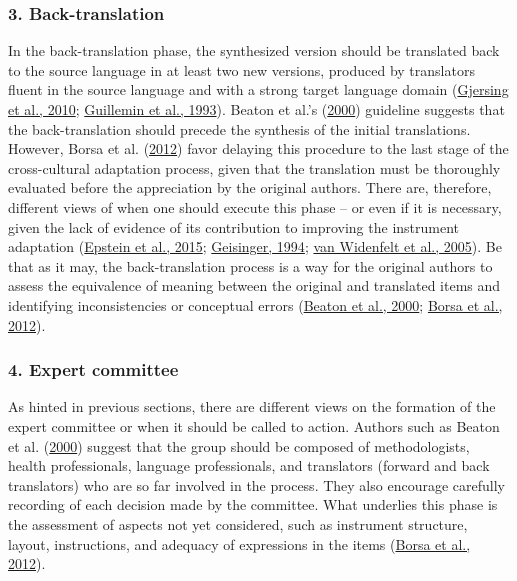 \documentclass[
  ,doc,11pt, twoside,floatsintext]{apa6}
\begin{document}
\hypertarget{back-translation}{%
\subsubsection{3. Back-translation}\label{back-translation}}

In the back-translation phase, the synthesized version should be translated back to the source language in at least two new versions, produced by translators fluent in the source language and with a strong target language domain (\protect\hyperlink{ref-gjersing2010}{Gjersing et al., 2010}; \protect\hyperlink{ref-guillemin1993}{Guillemin et al., 1993}). Beaton et al.'s (\protect\hyperlink{ref-beaton2000}{2000}) guideline suggests that the back-translation should precede the synthesis of the initial translations. However, Borsa et al. (\protect\hyperlink{ref-borsaAdaptacaoValidacaoInstrumentos2012}{2012}) favor delaying this procedure to the last stage of the cross-cultural adaptation process, given that the translation must be thoroughly evaluated before the appreciation by the original authors. There are, therefore, different views of when one should execute this phase -- or even if it is necessary, given the lack of evidence of its contribution to improving the instrument adaptation (\protect\hyperlink{ref-epstein2015}{Epstein et al., 2015}; \protect\hyperlink{ref-geisinger1994}{Geisinger, 1994}; \protect\hyperlink{ref-vanwidenfelt2005}{van Widenfelt et al., 2005}). Be that as it may, the back-translation process is a way for the original authors to assess the equivalence of meaning between the original and translated items and identifying inconsistencies or conceptual errors (\protect\hyperlink{ref-beaton2000}{Beaton et al., 2000}; \protect\hyperlink{ref-borsaAdaptacaoValidacaoInstrumentos2012}{Borsa et al., 2012}).

\hypertarget{expert-committee}{%
\subsubsection{4. Expert committee}\label{expert-committee}}

As hinted in previous sections, there are different views on the formation of the expert committee or when it should be called to action. Authors such as Beaton et al. (\protect\hyperlink{ref-beaton2000}{2000}) suggest that the group should be composed of methodologists, health professionals, language professionals, and translators (forward and back translators) who are so far involved in the process. They also encourage carefully recording of each decision made by the committee. What underlies this phase is the assessment of aspects not yet considered, such as instrument structure, layout, instructions, and adequacy of expressions in the items (\protect\hyperlink{ref-borsaAdaptacaoValidacaoInstrumentos2012}{Borsa et al., 2012}).
\end{document}
